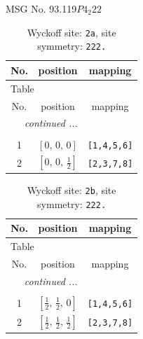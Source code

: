 \documentclass[fleqn,8pt]{jsarticle}
\begin{document}
\setcounter{MaxMatrixCols}{32}

\renewcommand{\tablename}{Table~}
\renewcommand{\figurename}{Figure~}
\begin{center}
\LARGE
MSG No. 93.119\quad$P4_{2}22$
\end{center}
\renewcommand{\arraystretch}{1.2}
\begin{longtable}{ccc}
\caption{Wyckoff site: {\tt 2a}, site symmetry: {\tt 222.}}
 \\
 \hline \hline
No. & position & mapping \\ \hline \endfirsthead

\multicolumn{2}{l}{\tablename\ \thetable{}} \\
 \hline \hline
No. & position & mapping \\ \hline \endhead

 \hline \hline
\multicolumn{2}{r}{\footnotesize\it continued ...} \\ \endfoot

 \hline \hline
\multicolumn{2}{r}{} \\ \endlastfoot

1 & $\left[ 0,\, 0,\, 0 \right]$ & {\tt [1,4,5,6]} \\ \hline
2 & $\left[ 0,\, 0,\, \frac{1}{2} \right]$ & {\tt [2,3,7,8]} \\
\end{longtable}
\renewcommand{\arraystretch}{1.2}
\begin{longtable}{ccc}
\caption{Wyckoff site: {\tt 2b}, site symmetry: {\tt 222.}}
 \\
 \hline \hline
No. & position & mapping \\ \hline \endfirsthead

\multicolumn{2}{l}{\tablename\ \thetable{}} \\
 \hline \hline
No. & position & mapping \\ \hline \endhead

 \hline \hline
\multicolumn{2}{r}{\footnotesize\it continued ...} \\ \endfoot

 \hline \hline
\multicolumn{2}{r}{} \\ \endlastfoot

1 & $\left[ \frac{1}{2},\, \frac{1}{2},\, 0 \right]$ & {\tt [1,4,5,6]} \\ \hline
2 & $\left[ \frac{1}{2},\, \frac{1}{2},\, \frac{1}{2} \right]$ & {\tt [2,3,7,8]} \\
\end{longtable}
\end{document}
